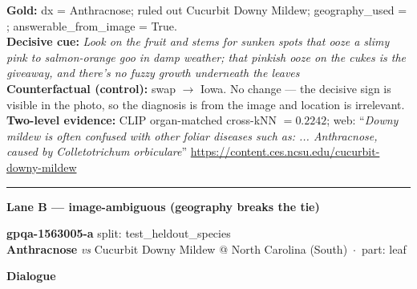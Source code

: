 \documentclass[11pt]{article}
\begin{document}
\textbf{Gold:} dx = Anthracnose; ruled out Cucurbit Downy Mildew; geography\_used = ; answerable\_from\_image = True.\\
\textbf{Decisive cue:} \emph{Look on the fruit and stems for sunken spots that ooze a slimy pink to salmon-orange goo in damp weather; that pinkish ooze on the cukes is the giveaway, and there's no fuzzy growth underneath the leaves}\\
\textbf{Counterfactual (control):} swap $\rightarrow$ Iowa. No change --- the decisive sign is visible in the photo, so the diagnosis is from the image and location is irrelevant.\\
\textbf{Two-level evidence:} CLIP organ-matched cross-kNN $=0.2242$; web: ``\emph{Downy mildew is often confused with other foliar diseases such as: ... Anthracnose, caused by Colletotrichum orbiculare}'' \footnotesize\url{https://content.ces.ncsu.edu/cucurbit-downy-mildew}
\vspace{8pt}\hrule\vspace{6pt}
\textbf{Lane B --- image-ambiguous (geography breaks the tie)}\\[2pt]
\colorbox{lav}{\parbox{\dimexpr\textwidth-2\fboxsep}{\textbf{gpqa-1563005-a} \hfill split: test\_heldout\_species\\\textbf{Anthracnose} \emph{vs} Cucurbit Downy Mildew \quad @ North Carolina (South) \,$\cdot$\, part: leaf}}
\vspace{4pt}\textbf{Dialogue}
\end{document}
